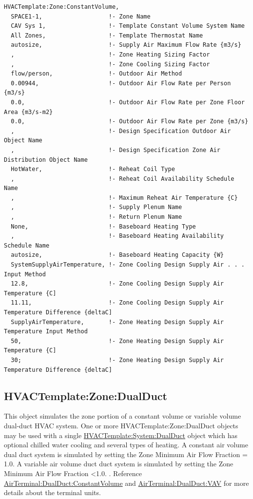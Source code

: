 \begin{lstlisting}
HVACTemplate:Zone:ConstantVolume,
  SPACE1-1,                   !- Zone Name
  CAV Sys 1,                  !- Template Constant Volume System Name
  All Zones,                  !- Template Thermostat Name
  autosize,                   !- Supply Air Maximum Flow Rate {m3/s}
  ,                           !- Zone Heating Sizing Factor
  ,                           !- Zone Cooling Sizing Factor
  flow/person,                !- Outdoor Air Method
  0.00944,                    !- Outdoor Air Flow Rate per Person {m3/s}
  0.0,                        !- Outdoor Air Flow Rate per Zone Floor Area {m3/s-m2}
  0.0,                        !- Outdoor Air Flow Rate per Zone {m3/s}
  ,                           !- Design Specification Outdoor Air Object Name
  ,                           !- Design Specification Zone Air Distribution Object Name
  HotWater,                   !- Reheat Coil Type
  ,                           !- Reheat Coil Availability Schedule Name
  ,                           !- Maximum Reheat Air Temperature {C}
  ,                           !- Supply Plenum Name
  ,                           !- Return Plenum Name
  None,                       !- Baseboard Heating Type
  ,                           !- Baseboard Heating Availability Schedule Name
  autosize,                   !- Baseboard Heating Capacity {W}
  SystemSupplyAirTemperature, !- Zone Cooling Design Supply Air . . . Input Method
  12.8,                       !- Zone Cooling Design Supply Air Temperature {C]
  11.11,                      !- Zone Cooling Design Supply Air Temperature Difference {deltaC]
  SupplyAirTemperature,       !- Zone Heating Design Supply Air Temperature Input Method
  50,                         !- Zone Heating Design Supply Air Temperature {C]
  30;                         !- Zone Heating Design Supply Air Temperature Difference {deltaC]
\end{lstlisting}

\subsection{HVACTemplate:Zone:DualDuct}\label{hvactemplatezonedualduct}

This object simulates the zone portion of a constant volume or variable volume dual-duct HVAC system. One or more HVACTemplate:Zone:DualDuct objects may be used with a single \hyperref[hvactemplatesystemdualduct]{HVACTemplate:System:DualDuct} object which has optional chilled water cooling and several types of heating. A constant air volume dual duct system is simulated by setting the Zone Minimum Air Flow Fraction = 1.0. A variable air volume duct duct system is simulated by setting the Zone Minimum Air Flow Fraction \textless{}1.0. . Reference \hyperref[airterminaldualductconstantvolume]{AirTerminal:DualDuct:ConstantVolume} and \hyperref[airterminaldualductvav]{AirTerminal:DualDuct:VAV} for more details about the terminal units.

